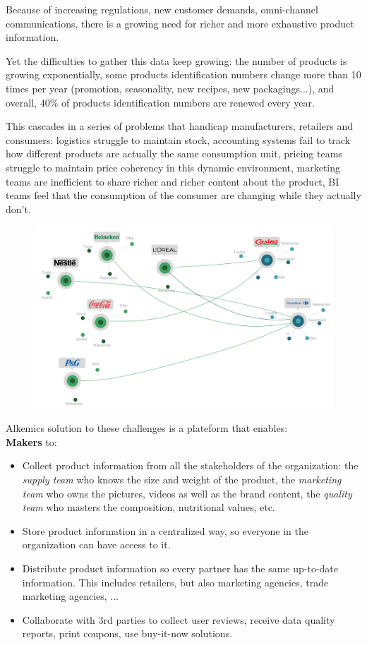 Because of increasing regulations, new customer demands, omni-channel communications, there is a growing need for richer and more exhaustive product information. 

Yet the difficulties to gather this data keep growing: the number of products is growing exponentially, some products identification numbers change more than 10 times per year (promotion, seasonality, new recipes, new packagings...), and overall, 40\% of products identification numbers are renewed every year.

This cascades in a series of problems that handicap manufacturers, retailers and consumers: logistics struggle to maintain stock, accounting systems fail to track how different products are actually the same consumption unit, pricing teams struggle to maintain price coherency in this dynamic environment, marketing teams are inefficient to share richer and richer content about the product, BI teams feel that the consumption of the consumer are changing while they actually don't. 


\begin{figure}[H]
\centering
\includegraphics[scale=0.35]{./images/introduction/without_alk.png}
\end{figure}


Alkemics solution to these challenges is a plateform that enables:
\\

\textbf{Makers} to:
    \begin{itemize}
    \item Collect product information from all the stakeholders of the organization: the \textit{supply team} who knows the size and weight of the product, the \textit{marketing team} who owns the pictures, videos as well as the brand content, the \textit{quality team} who masters the composition, nutritional values, etc.
    \item Store product information in a centralized way, so everyone in the organization can have access to it.
    \item Distribute product information so every partner has the same up-to-date information. This includes retailers, but also marketing agencies, trade marketing agencies, ...
    \item Collaborate with 3rd parties to collect user reviews,  receive data quality reports,  print coupons, use buy-it-now solutions.
    \end{itemize}

